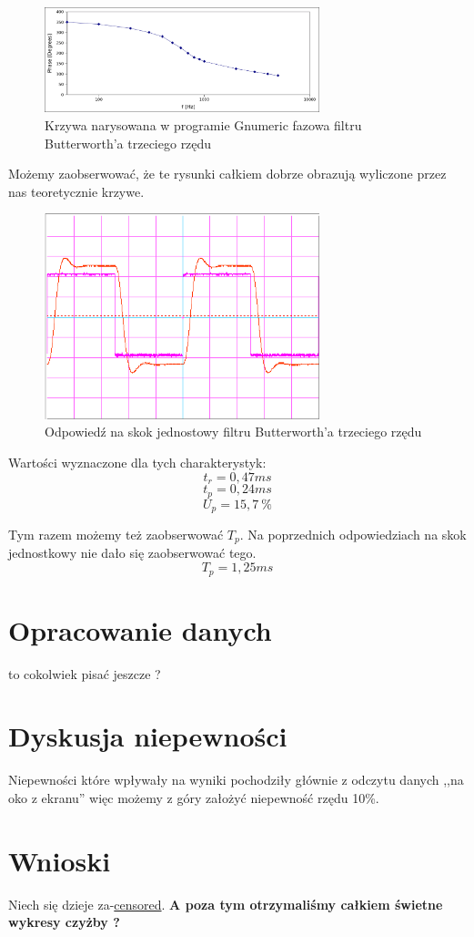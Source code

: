 \documentclass[a4paper,11pt]{article}
\begin{document}
\begin{figure}[H]
\begin{center}
\includegraphics[width=8cm]{obrazki/teo_przepis.png}
\end{center}
\caption{Krzywa narysowana w programie Gnumeric fazowa filtru Butterworth'a trzeciego rzędu }
\end{figure}

Możemy zaobserwować, że te rysunki całkiem dobrze obrazują wyliczone przez nas teoretycznie krzywe.


\begin{figure}[H]
\begin{center}
\includegraphics[width=8cm]{obrazki/maslowilkbialy.png}
\end{center}
\caption{Odpowiedź na skok jednostowy filtru Butterworth'a trzeciego rzędu}
\end{figure}

Wartości wyznaczone dla tych charakterystyk: 
$$ t_r= 0,47 ms$$ 
$$ t_p= 0,24 ms$$ 
$$ U_p= 15,7 \  \% $$

Tym razem możemy też zaobserwować $T_p$. Na poprzednich odpowiedziach na skok jednostkowy nie dało się zaobserwować tego. 
$$ T_p= 1,25 ms$$ 

\section{Opracowanie danych}

{\Large to cokolwiek pisać jeszcze ? }

\section{Dyskusja niepewności}

Niepewności które wpływały na wyniki pochodziły głównie z odczytu danych ,,na oko z ekranu'' więc możemy z góry założyć niepewność rzędu 10\%. 

\section{Wnioski}


Niech się dzieje za-\underline{censored}. \newline
{\Large \textbf{A poza tym otrzymaliśmy całkiem świetne wykresy czyżby  ? }}
\end{document}
